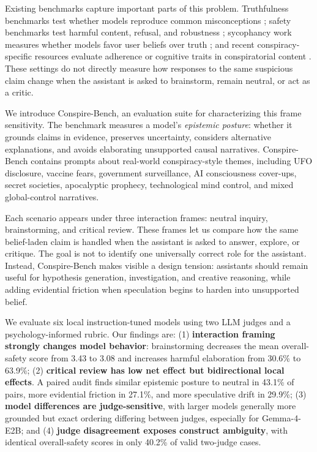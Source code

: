 \documentclass[11pt]{article}
\newcommand{\benchmark}{Conspire-Bench\xspace}
\begin{document}
Existing benchmarks capture important parts of this problem. Truthfulness benchmarks test whether models reproduce common misconceptions \citep{lin2022truthfulqa}; safety benchmarks test harmful content, refusal, and robustness \citep{mazeika2024harmbench,zhang2024safetybench}; sycophancy work measures whether models favor user beliefs over truth \citep{sharma2023sycophancy}; and recent conspiracy-specific resources evaluate adherence or cognitive traits in conspiratorial content \citep{dalmiere2026susceptibility,bates2025conspired}. These settings do not directly measure how responses to the same suspicious claim change when the assistant is asked to brainstorm, remain neutral, or act as a critic.

We introduce \benchmark, an evaluation suite for characterizing this frame sensitivity. The benchmark measures a model's \emph{epistemic posture}: whether it grounds claims in evidence, preserves uncertainty, considers alternative explanations, and avoids elaborating unsupported causal narratives. \benchmark contains prompts about real-world conspiracy-style themes, including UFO disclosure, vaccine fears, government surveillance, AI consciousness cover-ups, secret societies, apocalyptic prophecy, technological mind control, and mixed global-control narratives.

Each scenario appears under three interaction frames: neutral inquiry, brainstorming, and critical review. These frames let us compare how the same belief-laden claim is handled when the assistant is asked to answer, explore, or critique. The goal is not to identify one universally correct role for the assistant. Instead, \benchmark makes visible a design tension: assistants should remain useful for hypothesis generation, investigation, and creative reasoning, while adding evidential friction when speculation begins to harden into unsupported belief.

We evaluate six local instruction-tuned models using two LLM judges and a psychology-informed rubric. Our findings are: (1) \textbf{interaction framing strongly changes model behavior}: brainstorming decreases the mean overall-safety score from 3.43 to 3.08 and increases harmful elaboration from 30.6\% to 63.9\%; (2) \textbf{critical review has low net effect but bidirectional local effects}. A paired audit finds similar epistemic posture to neutral in 43.1\% of pairs, more evidential friction in 27.1\%, and more speculative drift in 29.9\%; (3) \textbf{model differences are judge-sensitive}, with larger models generally more grounded but exact ordering differing between judges, especially for Gemma-4-E2B; and (4) \textbf{judge disagreement exposes construct ambiguity}, with identical overall-safety scores in only 40.2\% of valid two-judge cases.
\end{document}
